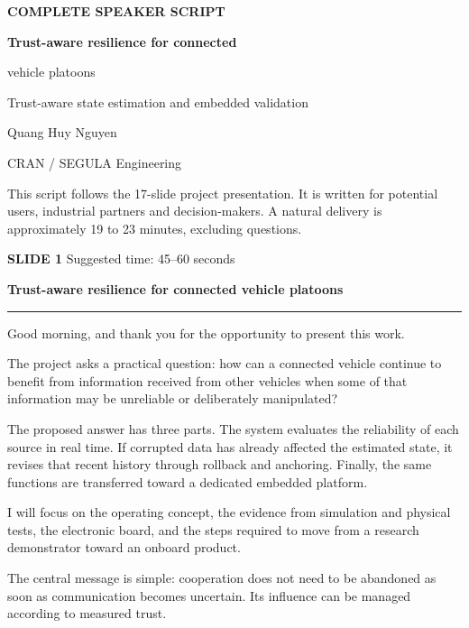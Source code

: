 \documentclass[11pt,a4paper]{article}
\newcommand{\slidetitle}[3]{%
  \clearpage
  {\color{BrandCyan}\large\bfseries SLIDE #1}\hfill
  {\color{Muted}\small Suggested time: #3}\par
  \vspace{0.18cm}
  {\color{BrandBlue}\LARGE\bfseries #2}\par
  \vspace{0.20cm}
  {\color{BrandMagenta}\rule{1.1cm}{1.2pt}}\par
  \vspace{0.12cm}
}
\begin{document}
\begin{titlepage}
  \vspace*{1.8cm}
  {\color{BrandCyan}\large\bfseries COMPLETE SPEAKER SCRIPT}\par
  \vspace{0.30cm}
  {\color{BrandBlue}\Huge\bfseries Trust-aware resilience for connected\par vehicle platoons}\par
  \vspace{0.38cm}
  {\Large\color{Muted}Trust-aware state estimation and embedded validation}\par
  \vspace{1.0cm}
  {\large Quang Huy Nguyen}\par
  \vspace{0.12cm}
  {\color{Muted}CRAN / SEGULA Engineering}\par
  \vfill
  \colorbox{Panel}{%
    \parbox{\dimexpr\textwidth-2\fboxsep\relax}{%
      \raggedright This script follows the 17-slide project presentation. It is written for potential users, industrial partners and decision-makers. A natural delivery is approximately 19 to 23 minutes, excluding questions.}}
\end{titlepage}

\slidetitle{1}{Trust-aware resilience for connected vehicle platoons}{45--60 seconds}

Good morning, and thank you for the opportunity to present this work.

The project asks a practical question: how can a connected vehicle continue to benefit from information received from other vehicles when some of that information may be unreliable or deliberately manipulated?

The proposed answer has three parts. The system evaluates the reliability of each source in real time. If corrupted data has already affected the estimated state, it revises that recent history through rollback and anchoring. Finally, the same functions are transferred toward a dedicated embedded platform.

I will focus on the operating concept, the evidence from simulation and physical tests, the electronic board, and the steps required to move from a research demonstrator toward an onboard product.

The central message is simple: cooperation does not need to be abandoned as soon as communication becomes uncertain. Its influence can be managed according to measured trust.
\end{document}
